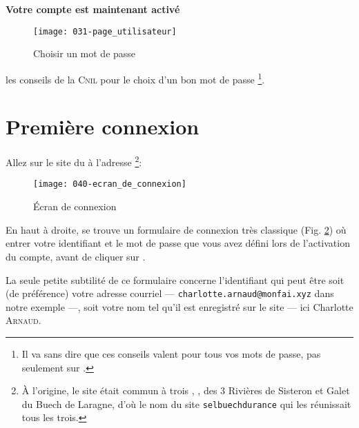 \medskip

\begin{center}
    \textbf{Votre compte est maintenant activé}
\end{center}

\begin{center}
\end{center}
\begin{figure}
    \texttt{[image: 031-page\_utilisateur]}
    \caption{Choisir un mot de passe}
    \label{fig:choisirMdp}
\end{figure}
\medskip
les conseils de la \textsc{Cnil} pour le choix d’un bon mot de passe%
\footnote{Il va sans dire que ces conseils valent pour tous vos mots de passe, pas seulement sur \CF.}.

\section{Première connexion}

Allez sur le site du \CdS à l’adresse%
\footnote{À l'origine, le site était commun à trois \sel, \CdS, \sel des 3 Rivières de Sisteron et Galet du Buech de Laragne, d'où le nom du site \texttt{selbuechdurance} qui les réunissait tous les trois.}:
\begin{center}
\end{center}

\medskip

\begin{figure}
    \centering
    \texttt{[image: 040-ecran\_de\_connexion]}
    \caption{Écran de connexion}
    \label{fig:ecranConnexion}
\end{figure}
En haut à droite, se trouve un formulaire de connexion très classique (Fig. \ref{fig:ecranConnexion}) où entrer votre identifiant et le mot de passe que vous avez défini lors de l’activation du compte, avant de cliquer sur .

La seule petite subtilité de ce formulaire concerne l’identifiant qui peut être soit (de préférence) votre adresse courriel --- \texttt{charlotte.arnaud@monfai.xyz} dans notre exemple ---, soit votre nom tel qu’il est enregistré sur le site ---  ici Charlotte \textsc{Arnaud}.

